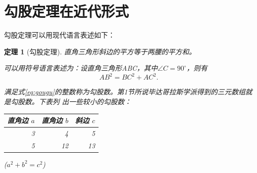\documentclass[UTF8]{ctexart} %
\newcommand{\degree}{^\circ}
\newtheorem{thm}{定理}
\begin{document}
\section{勾股定理在近代形式}
勾股定理可以用现代语言表述如下：
\begin{thm}[勾股定理]
	直角三角形斜边的平方等于两腰的平方和。
	
	可以用符号语言表述为：设直角三角形ABC，其中$\angle C = 90\degree$，则有
\begin{equation}\label{eq:gougu}
AB^2 = BC^2 + AC^2.
\end{equation}
	
满足式\eqref{eq:gougu}的整数称为\emph{勾股数}。第1节所说毕达哥拉斯学派得到的三元数组就是勾股数。下表列
出一些较小的勾股数：
\begin{table}[H]	%
\begin{tabular}{|rrr|}	%
\hline
直角边 $a$ & 直角边 $b$ & 斜边 $c$	\\
\hline
3 &	4 &	5\\
5 &	12 & 13\\
\hline	
\end{tabular}%
\qquad	%
($a^2+b^2=c^2$)
\end{table}
\end{thm}

\nocite{Shiye}	%
\end{document}
